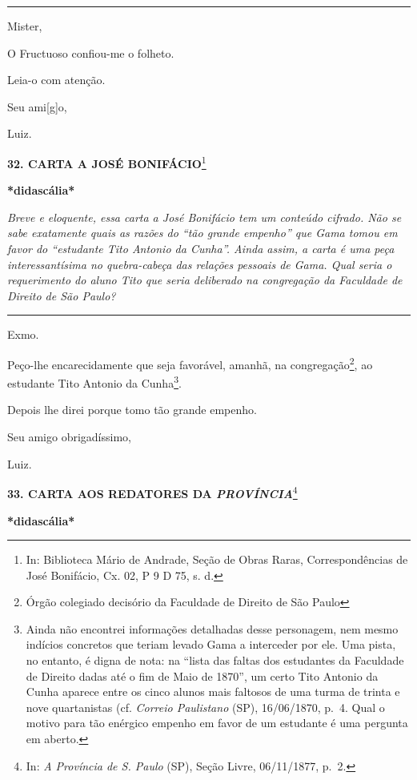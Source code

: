 \begin{center}\rule{0.5\linewidth}{\linethickness}\end{center}

Mister,

O Fructuoso confiou-me o folheto.

Leia-o com atenção.

Seu ami{[}g{]}o,

Luiz.

\textbf{32. CARTA A JOSÉ BONIFÁCIO}\footnote{In: Biblioteca Mário de
  Andrade, Seção de Obras Raras, Correspondências de José Bonifácio, Cx.
  02, P 9 D 75, s. d.}

\textbf{*didascália*}

\emph{Breve e eloquente, essa carta a José Bonifácio tem um conteúdo
cifrado. Não se sabe exatamente quais as razões do ``tão grande
empenho'' que Gama tomou em favor do ``estudante Tito Antonio da
Cunha''. Ainda assim, a carta é uma peça interessantísima no
quebra-cabeça das relações pessoais de Gama. Qual seria o requerimento
do aluno Tito que seria deliberado na congregação da Faculdade de
Direito de São Paulo? }

\begin{center}\rule{0.5\linewidth}{\linethickness}\end{center}

Exmo.

Peço-lhe encarecidamente que seja favorável, amanhã, na
congregação\footnote{Órgão colegiado decisório da Faculdade de Direito
  de São Paulo}, ao estudante Tito Antonio da Cunha\footnote{Ainda não
  encontrei informações detalhadas desse personagem, nem mesmo indícios
  concretos que teriam levado Gama a interceder por ele. Uma pista, no
  entanto, é digna de nota: na ``lista das faltas dos estudantes da
  Faculdade de Direito dadas até o fim de Maio de 1870'', um certo Tito
  Antonio da Cunha aparece entre os cinco alunos mais faltosos de uma
  turma de trinta e nove quartanistas (cf. \emph{Correio Paulistano}
  (SP), 16/06/1870, p.~4. Qual o motivo para tão enérgico empenho em
  favor de um estudante é uma pergunta em aberto.}.

Depois lhe direi porque tomo tão grande empenho.

Seu amigo obrigadíssimo,

Luiz.

\textbf{33. CARTA AOS REDATORES DA \emph{PROVÍNCIA}}\footnote{In:
  \emph{A Província de S. Paulo} (SP), Seção Livre, 06/11/1877, p.~2.}

\textbf{*didascália*}

